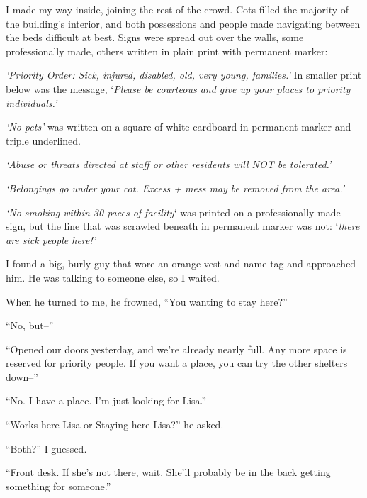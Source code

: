 I made my way inside, joining the rest of the crowd.  Cots filled the majority of the building's interior, and both possessions and people made navigating between the beds difficult at best.  Signs were spread out over the walls, some professionally made, others written in plain print with permanent marker:



\emph{`Priority Order: Sick, injured, disabled, old, very young, families.' } In smaller print below was the message, `\emph{Please be courteous and give up your places to priority individuals.'}



\emph{`No pets'} was written on a square of white cardboard in permanent marker and triple underlined.



\emph{ `Abuse or threats directed at staff or other residents will NOT be tolerated.'}



\emph{`Belongings go under your cot.  Excess + mess may be removed from the area.'}



\emph{`No smoking within 30 paces of facility}` was printed on a professionally made sign, but the line that was scrawled beneath in permanent marker was not: `\emph{there are sick people here!'}



I found a big, burly guy that wore an orange vest and name tag and approached him.  He was talking to someone else, so I waited.



When he turned to me, he frowned, ``You wanting to stay here?''



``No, but--''



``Opened our doors yesterday, and we're already nearly full.  Any more space is reserved for priority people.  If you want a place, you can try the other shelters down--''



``No.  I have a place.  I'm just looking for Lisa.''



``Works-here-Lisa or Staying-here-Lisa?'' he asked.



``Both?'' I guessed.



``Front desk.  If she's not there, wait.  She'll probably be in the back getting something for someone.''




